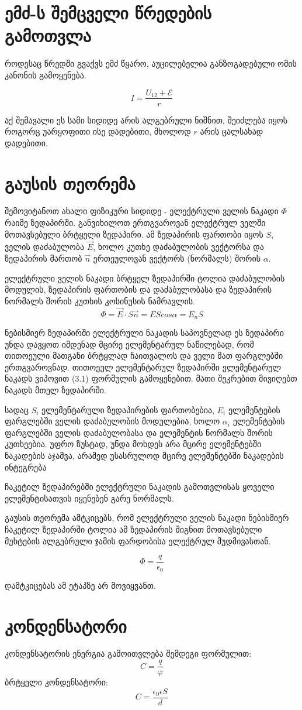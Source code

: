 \documentclass{book}
\begin{document}
\section{ემძ-ს შემცველი წრედების გამოთვლა}
როდესაც წრედში გვაქვს ემძ წყარო, აუცილებელია განზოგადებული ომის კანონის გამოყენება. 

$$I = \frac{U_{12} + \mathcal{E}}{r}$$

აქ შემავალი ეს სამი სიდიდე არის ალგებრული ნიშნით, შეიძლება იყოს როგორც უარყოფითი ისე დადებითი, მხოლოდ $r$ არის ცალსახად დადებითი.
\section{გაუსის თეორემა}
შემოვიტანოთ ახალი ფიზიკური სიდიდე - ელექტრული ველის ნაკადი $\Phi$ რაიმე ზედაპირში. განვიხილოთ ერთგვაროვან ელექტრულ ველში მოთავსებული ბრტყელი ზედაპირი. ამ ზედაპირის ფართობი იყოს $S$, ველის დაძაბულობა $\vec{E}$, ხოლო კუთხე დაძაბულობის ვექტორსა და ზედაპირის მართობ $\vec{n}$ ერთეულოვან ვექტორს (ნორმალს) შორის $\alpha$.

ელექტრული ველის ნაკადი ბრტყელ ზედაპირში ტოლია დაძაბულობის მოდულის, ზედაპირის ფართობის და დაძაბულობასა და ზედაპირის ნორმალს შორის კუთხის კოსინუსის ნამრავლის.
	$$\Phi = \vec{E}\cdot S\vec{n}=EScos\alpha=E_n S$$

ნებისმიერ ზედაპირში ელექტრული ნაკადის საპოვნელად ეს ზედაპირი უნდა დავყოთ იმდენად მცირე ელემენტარულ ნაწილებად, რომ თითოეული მათგანი ბრტყლად ჩაითვალოს და ველი მათ ფარგლებში ერთგვაროვნად. თითოეულ ელემენტარულ ზედაპირში ელემენტარულ ნაკადს ვიპოვით (3.1) ფორმულის გამოყენებით. მათი შეკრებით მივიღებთ ნაკადს მთელ ზედაპირში.

სადაც $S_i$ ელემენტარული ზედაპირების ფართობებია, $E_i$ ელემენტების ფარგლებში ველის დაძაბულობის მოდულებია, ხოლო $\alpha_i$ ელემენტების ფარგლებში ველის დაძაბულობასა და ელემენტის ნორმალს შორის კუთხეებია. უფრო ზუსტად, უნდა მოხდეს არა მცირე ელემენტებში ნაკადების აჯამვა, არამედ უსასრულოდ მცირე ელემენტებში ნაკადების ინტეგრება

ჩაკეტილ ზედაპირებში ელექტრული ნაკადის გამოთვლისას ყოველი
ელემენტისათვის იყენებენ გარე ნორმალს.
 
გაუსის თეორემა ამტკიცებს, რომ ელექტრული ველის ნაკადი ნებისმიერ ჩაკეტილ ზედაპირში ტოლია ამ ზედაპირის შიგნით მოთავსებული მუხტების ალგებრული ჯამის ფარდობისა ელექტრულ მუდმივასთან.

$$\Phi = \frac{q}{\epsilon_0}$$

დამტკიცებას ამ ეტაპზე არ მოვიყვანთ.
\section{კონდენსატორი}
კონდენსატორის ენერგია გამოითვლება შემდეგი ფორმულით:
$$C = \frac{q}{\varphi}$$
ბრტყელი კონდენსატორი:
$$C = \frac{\epsilon_0 \epsilon S}{d}$$
\end{document}
